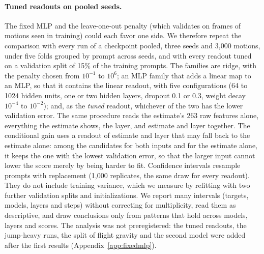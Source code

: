 \paragraph{Tuned readouts on pooled seeds.} The fixed MLP and the leave-one-out penalty (which validates on frames of motions seen in training) could each favor one side. We therefore repeat the comparison with every run of a checkpoint pooled, three seeds and 3,000 motions, under five folds grouped by prompt across seeds, and with every readout tuned on a validation split of 15\% of the training prompts. The families are ridge, with the penalty chosen from $10^{-1}$ to $10^{6}$; an MLP family that adds a linear map to an MLP, so that it contains the linear readout, with five configurations (64 to 1024 hidden units, one or two hidden layers, dropout 0.1 or 0.3, weight decay $10^{-4}$ to $10^{-2}$); and, as the \emph{tuned} readout, whichever of the two has the lower validation error. The same procedure reads the estimate's 263 raw features alone, everything the estimate shows, the layer, and estimate and layer together. The conditional gain uses a readout of estimate and layer that may fall back to the estimate alone: among the candidates for both inputs and for the estimate alone, it keeps the one with the lowest validation error, so that the larger input cannot lower the score merely by being harder to fit. Confidence intervals resample prompts with replacement (1,000 replicates, the same draw for every readout). They do not include training variance, which we measure by refitting with two further validation splits and initializations. We report many intervals (targets, models, layers and steps) without correcting for multiplicity, read them as descriptive, and draw conclusions only from patterns that hold across models, layers and scores. The analysis was not preregistered: the tuned readouts, the jump-heavy runs, the split of flight gravity and the second model were added after the first results (Appendix~\ref{app:fixedmlp}).

